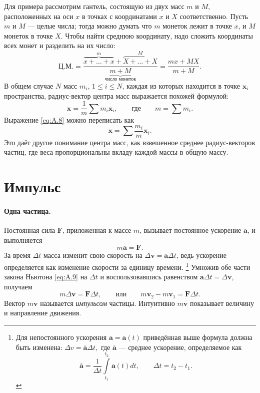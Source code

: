 Для примера рассмотрим гантель, состоящую из двух масс $m$ и $M$, расположенных на оси $x$ в точках с координатами $x$ и $X$ соответственно.
Пусть $m$ и $M$ --- целые числа;
тогда можно думать что $m$ монеток лежит в точке $x$,
и $M$ монеток в точке $X$.
Чтобы найти среднюю координату, надо сложить координаты всех монет и разделить на их число:
\[
\text{Ц.М.} =
\frac{\overbrace{x + \dots + x}^{m} + \overbrace{X + \dots + X}^{M}}{\underbrace{m+M}_{\text{число монеток}}}
=\frac{mx + MX}{m+M}.
\]
В общем случае $N$ масс $m_i$, $1 \le i \le N$, каждая из
которых находится в точке $\mathbf{x}_i$ пространства, радиус-вектор
центра масс выражается похожей формулой:
\begin{equation}
    \mathbf{x} = \frac{1}{m} \sum m_i  \mathbf{x}_i,
    \qquad\text{где}\qquad m = \sum m_i.
    \label{eq:A.8}
\end{equation}
Выражение \eqref{eq:A.8} можно переписать как
\[
\mathbf{x} = \sum \frac{m_i}{m}  \mathbf{x}_i.
\]
Это даёт другое понимание центра масс, как взвешенное среднее радиус-векторов частиц, где веса пропорциональны вкладу каждой массы в общую массу.

\section{Импульс}

\paragraph{Одна частица.}
Постоянная сила $\mathbf{F}$, приложенная
к массе $m$, вызывает постоянное ускорение $\mathbf{a}$, и выполняется
\begin{equation}
    m \mathbf{a} = \mathbf{F}.
    \label{eq:A.9}
\end{equation}
За время $\Delta t$ масса изменит свою скорость на
$\Delta \mathbf{v} = \mathbf{a}\Delta t$, ведь ускорение определяется как изменение скорости за единицу времени.%
\footnote{Для непостоянного ускорения $\mathbf{a}= \mathbf{a}(t)$ приведённая выше формула должна быть изменена: $\Delta v = \bar{\mathbf{a}}  \Delta t,$
где $\bar{\mathbf{a}}$ --- среднее ускорение, определяемое как
\[
\bar{\mathbf{a}} = \frac{1}{\Delta t} \int\limits_{t_1}^{t_2} \mathbf{a}(t) dt,
\qquad \Delta t = t_2 - t_1.
\]
}
Умножив обе части закона Ньютона \eqref{eq:A.9} на $\Delta t$
и воспользовавшись равенством $\mathbf{a}\Delta t = \Delta \mathbf{v}$, получаем
\begin{equation}
m \Delta \mathbf{v} = \mathbf{F}\Delta t,
\qquad \text{или} \qquad
m \mathbf{v}_2 - m \mathbf{v}_1 = \mathbf{F}\Delta t.
\label{eq:A.10}
\end{equation}
Вектор $m\mathbf{v}$ называется \textit{импульсом} частицы.
Интуитивно $m\mathbf{v}$ показывает величину и направление движения.

